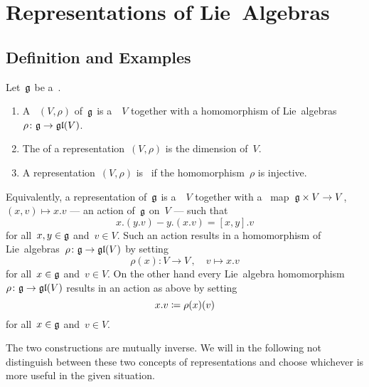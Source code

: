 \section{Representations of Lie~Algebras}







\subsection{Definition and Examples}


\begin{definition}
  Let~$\mathfrak{g}$ be a~{\liealgebra{$\kf$}}.
  \begin{enumerate}
    \item
      A ~$(V, \rho)$ of~$\mathfrak{g}$ is a~{\vectorspace{$\kf$}}~$V$ together with a homomorphism of Lie~algebras~$\rho \colon \mathfrak{g} \to \mathfrak{gl}(V)$.
    \item
      The  of a representation~$(V, \rho)$ is the dimension of~$V$.
    \item
      A representation~$(V, \rho)$ is~ if the homomorphism~$\rho$ is injective.
  \end{enumerate}
\end{definition}


\begin{remark}
  Equivalently, a representation of~$\mathfrak{g}$ is a~{\vectorspace{$\kf$}}~$V$ together with a~{\bilinear{$\kf$}} map~$\mathfrak{g} \times V \to V$,~$(x,v) \mapsto x.v$ --- an action of~$\mathfrak{g}$ on~$V$ --- such that
  \begin{equation}
  \label{representation via action}
    x.(y.v) - y.(x.v)
    =
    [x,y].v
  \end{equation}
  for all~$x, y \in \mathfrak{g}$ and~$v \in V$.
  Such an action results in a homomorphism of Lie~algebras~$\rho \colon \mathfrak{g} \to \mathfrak{gl}(V)$ by setting
  \[
    \rho(x)
    \colon
    V
    \to
    V \,,
    \quad
    v
    \mapsto
    x.v
  \]
  for all~$x \in \mathfrak{g}$ and~$v \in V$.
  On the other hand every Lie~algebra homomorphism~$\rho \colon \mathfrak{g} \to \mathfrak{gl}(V)$ results in an action as above by setting
  \[
    x.v
    \coloneqq
    \rho(x)(v)
  \]
  for all~$x \in \mathfrak{g}$ and~$v \in V$.
  
  The two constructions are mutually inverse.
  We will in the following not distinguish between these two concepts of representations and choose whichever is more useful in the given situation.
\end{remark}



